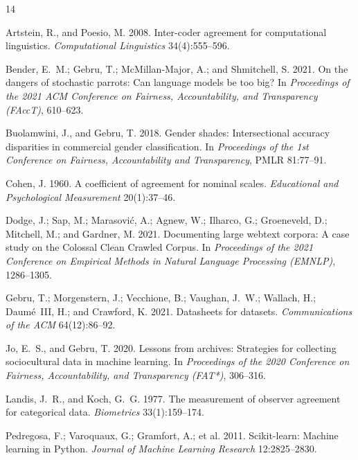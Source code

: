 \documentclass[letterpaper,twocolumn,10pt]{article}
\begin{document}
\begin{thebibliography}{14}

Artstein, R., and Poesio, M. 2008. Inter-coder agreement for
computational linguistics. \emph{Computational Linguistics}
34(4):555--596.

Bender, E.~M.; Gebru, T.; McMillan-Major, A.; and Shmitchell, S. 2021.
On the dangers of stochastic parrots: Can language models be too big?
In \emph{Proceedings of the 2021 ACM Conference on Fairness,
Accountability, and Transparency (FAccT)}, 610--623.

Buolamwini, J., and Gebru, T. 2018. Gender shades: Intersectional
accuracy disparities in commercial gender classification. In
\emph{Proceedings of the 1st Conference on Fairness, Accountability and
Transparency}, PMLR 81:77--91.

Cohen, J. 1960. A coefficient of agreement for nominal scales.
\emph{Educational and Psychological Measurement} 20(1):37--46.

Dodge, J.; Sap, M.; Marasovi\'{c}, A.; Agnew, W.; Ilharco, G.;
Groeneveld, D.; Mitchell, M.; and Gardner, M. 2021. Documenting large
webtext corpora: A case study on the Colossal Clean Crawled Corpus. In
\emph{Proceedings of the 2021 Conference on Empirical Methods in
Natural Language Processing (EMNLP)}, 1286--1305.

Gebru, T.; Morgenstern, J.; Vecchione, B.; Vaughan, J.~W.; Wallach, H.;
Daum\'{e}~III, H.; and Crawford, K. 2021. Datasheets for datasets.
\emph{Communications of the ACM} 64(12):86--92.

Jo, E.~S., and Gebru, T. 2020. Lessons from archives: Strategies for
collecting sociocultural data in machine learning. In \emph{Proceedings
of the 2020 Conference on Fairness, Accountability, and Transparency
(FAT*)}, 306--316.

Landis, J.~R., and Koch, G.~G. 1977. The measurement of observer
agreement for categorical data. \emph{Biometrics} 33(1):159--174.

Pedregosa, F.; Varoquaux, G.; Gramfort, A.; et al. 2011. Scikit-learn:
Machine learning in Python. \emph{Journal of Machine Learning Research}
12:2825--2830.


\end{thebibliography}
\end{document}
